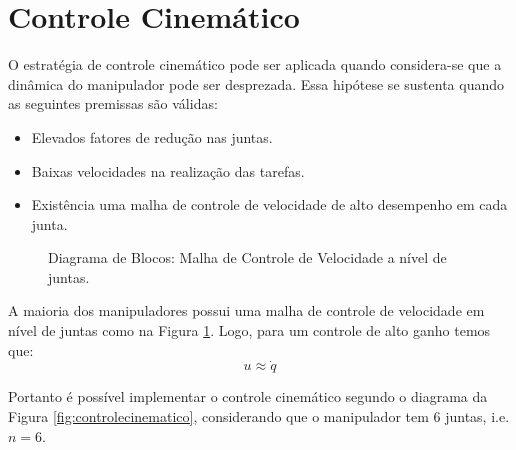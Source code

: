 \section{Controle Cinemático} \label{sec:controle_cinematico}
O estratégia de controle cinemático pode ser aplicada quando considera-se que a dinâmica do manipulador pode ser desprezada. Essa hipótese se sustenta quando as seguintes premissas são válidas:
\begin{itemize}
\item Elevados fatores de redução nas juntas.
\item Baixas velocidades na realização das tarefas.
\item Existência uma malha de controle de velocidade de alto desempenho em cada junta.
\end{itemize}

\begin{figure}[h!]
\centering
{}
\caption{Diagrama de Blocos: Malha de Controle de Velocidade a nível de juntas.}
\label{fig:controlejuntas}
\end{figure}

A maioria dos manipuladores possui uma malha de controle de velocidade em nível de juntas como na Figura \ref{fig:controlejuntas}. Logo, para um controle de alto ganho temos que:
\[ {u} \approx \dot{{q}}\]



Portanto é possível implementar o controle cinemático segundo o diagrama da Figura \ref{fig:controlecinematico}, considerando que o manipulador tem 6 juntas, i.e. $n=6$. %

